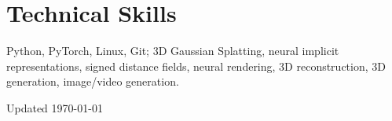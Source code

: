\documentclass[11pt,letterpaper]{report}
\begin{document}
    \section*{Technical Skills}
    Python, PyTorch, Linux, Git; 3D Gaussian Splatting, neural implicit representations, signed distance fields, neural rendering, 3D reconstruction, 3D generation, image/video generation.

    \begin{center}
        \vfill
        Updated \monthyeardate\today
    \end{center}
\end{document}

